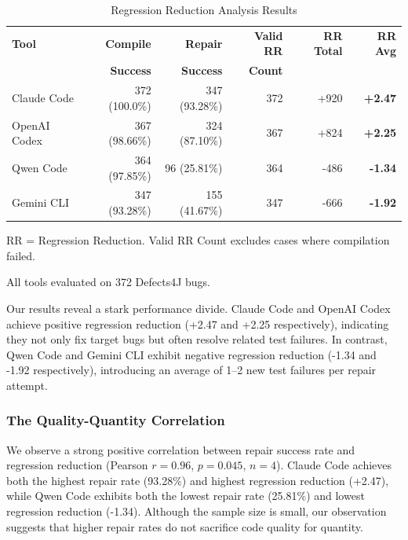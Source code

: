 \begin{table}[t]
\centering
\caption{Regression Reduction Analysis Results}
\label{tab:regression-reduction-results}
\begin{tabular}{@{}lrrrrr@{}}
\toprule
\textbf{Tool} & \textbf{Compile} & \textbf{Repair} & \textbf{Valid RR} & \textbf{RR Total} & \textbf{RR Avg} \\
              & \textbf{Success} & \textbf{Success} & \textbf{Count} & & \\
\midrule
Claude Code   & 372 (100.0\%) & 347 (93.28\%) & 372 & +920 & \textbf{+2.47} \\
OpenAI Codex  & 367 (98.66\%) & 324 (87.10\%) & 367 & +824 & \textbf{+2.25} \\
Qwen Code     & 364 (97.85\%) & 96 (25.81\%)  & 364 & -486 & \textbf{-1.34} \\
Gemini CLI    & 347 (93.28\%) & 155 (41.67\%) & 347 & -666 & \textbf{-1.92} \\
\bottomrule
\end{tabular}
\vspace{0.1cm}
\begin{tablenotes}
\small
\item RR = Regression Reduction. Valid RR Count excludes cases where compilation failed.
\item All tools evaluated on 372 Defects4J bugs.
\end{tablenotes}
\end{table}

Our results reveal a stark performance divide. Claude Code and OpenAI Codex achieve positive regression reduction (+2.47 and +2.25 respectively), indicating they not only fix target bugs but often resolve related test failures. In contrast, Qwen Code and Gemini CLI exhibit negative regression reduction (-1.34 and -1.92 respectively), introducing an average of 1--2 new test failures per repair attempt.

\subsubsection{The Quality-Quantity Correlation}

We observe a strong positive correlation between repair success rate and regression reduction (Pearson $r = 0.96$, $p = 0.045$, $n = 4$). Claude Code achieves both the highest repair rate (93.28\%) and highest regression reduction (+2.47), while Qwen Code exhibits both the lowest repair rate (25.81\%) and lowest regression reduction (-1.34). Although the sample size is small, our observation suggests that higher repair rates do not sacrifice code quality for quantity.


